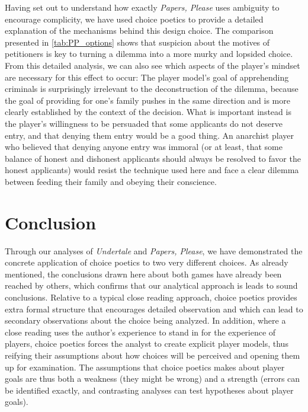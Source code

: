 \documentclass[arts,article,submit,moreauthors,pdftex,10pt,a4paper]{Definitions/mdpi}
\begin{document}
Having set out to understand how exactly \emph{Papers, Please} uses ambiguity to encourage complicity, we have used choice poetics to provide a detailed explanation of the mechanisms behind this design choice.
%
The comparison presented in \ref{tab:PP_options} shows that suspicion about the motives of petitioners is key to turning a dilemma into a more murky and lopsided choice.
%
From this detailed analysis, we can also see which aspects of the player's mindset are necessary for this effect to occur: The player model's goal of apprehending criminals is surprisingly irrelevant to the deconstruction of the dilemma, because the goal of providing for one's family pushes in the same direction and is more clearly established by the context of the decision.
%
What is important instead is the player's willingness to be persuaded that some applicants do not deserve entry, and that denying them entry would be a good thing.
%
An anarchist player who believed that denying anyone entry was immoral (or at least, that some balance of honest and dishonest applicants should always be resolved to favor the honest applicants) would resist the technique used here and face a clear dilemma between feeding their family and obeying their conscience.


\section{Conclusion}

Through our analyses of \emph{Undertale} and \emph{Papers, Please}, we have demonstrated the concrete application of choice poetics to two very different choices.
%
As already mentioned, the conclusions drawn here about both games have already been reached by others, which confirms that our analytical approach is leads to sound conclusions.
%
Relative to a typical close reading approach, choice poetics provides extra formal structure that encourages detailed observation and which can lead to secondary observations about the choice being analyzed.
%
In addition, where a close reading uses the author's experience to stand in for the experience of players, choice poetics forces the analyst to create explicit player models, thus reifying their assumptions about how choices will be perceived and opening them up for examination.
%
The assumptions that choice poetics makes about player goals are thus both a weakness (they might be wrong) and a strength (errors can be identified exactly, and contrasting analyses can test hypotheses about player goals).
\end{document}
